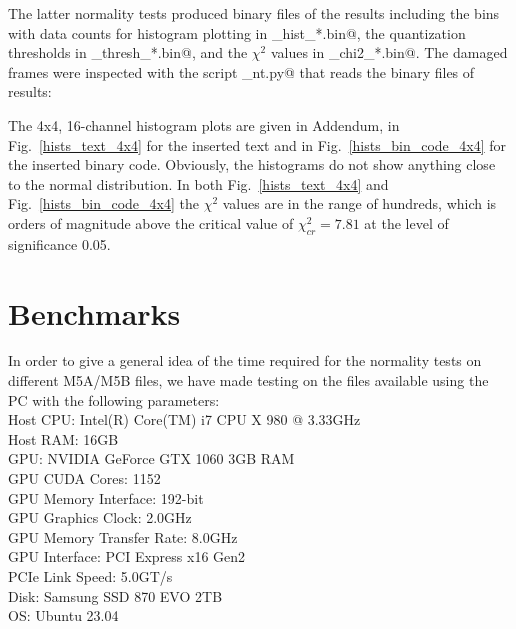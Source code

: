 \documentclass[letterpaper,twoside,12pt]{article}
\begin{document}
The latter normality tests produced binary files of the results including the bins with data counts for histogram plotting in \verb@nt_hist_*.bin@, the quantization thresholds in \verb@nt_thresh_*.bin@, and the $\chi^2$ values in \verb@nt_chi2_*.bin@. The damaged frames were inspected with the script \verb@inspect_nt.py@ that reads the binary files of results: \\

\noindent \verb@%run inspect_nt.py rd1910_wz_268-1811_bin_code.m5b 067  2000 1@ \\
\noindent \verb@%run inspect_nt.py rd1910_wz_268-1811_text.m5b 056  5006 1@. \\


The 4x4, 16-channel histogram plots are given in Addendum, in Fig.~\ref{hists_text_4x4} for the inserted text and in Fig.~\ref{hists_bin_code_4x4} for the inserted binary code. Obviously, the histograms do not show anything close to the normal distribution. In both Fig.~\ref{hists_text_4x4} and Fig.~\ref{hists_bin_code_4x4} the $\chi^2$ values are in the range of hundreds, which is orders of magnitude above the critical value of $\chi^2_{cr} = 7.81$ at the level of significance 0.05. 



\section{Benchmarks}

In order to give a general idea of the time required for the normality tests on different M5A/M5B files, we have made testing on the files available using the PC with the following parameters: \\

\indent Host CPU: Intel(R) Core(TM) i7 CPU X 980 @ 3.33GHz \\
\indent Host RAM: 16GB \\
\indent GPU: NVIDIA GeForce GTX 1060 3GB RAM \\
\indent GPU CUDA Cores: 1152 \\
\indent GPU Memory Interface: 192-bit \\
\indent GPU Graphics Clock: 2.0GHz \\
\indent GPU Memory Transfer Rate: 8.0GHz \\
\indent GPU Interface: PCI Express x16 Gen2 \\
\indent PCIe Link Speed: 5.0GT/s \\
\indent Disk: Samsung SSD 870 EVO 2TB \\
\indent OS: Ubuntu 23.04 \\
\end{document}
